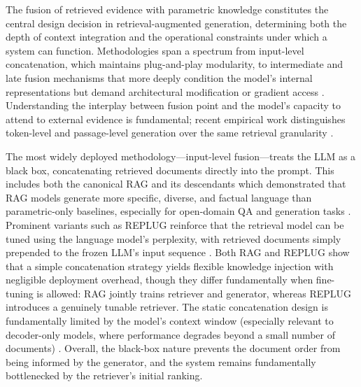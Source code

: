 \documentclass[11pt,a4paper]{article}
\begin{document}
The fusion of retrieved evidence with parametric knowledge constitutes the central design decision in retrieval-augmented generation, determining both the depth of context integration and the operational constraints under which a system can function. Methodologies span a spectrum from input-level concatenation, which maintains plug-and-play modularity, to intermediate and late fusion mechanisms that more deeply condition the model's internal representations but demand architectural modification or gradient access \cite{arxiv:2312.10997v5,arxiv:2508.06401v3}. Understanding the interplay between fusion point and the model's capacity to attend to external evidence is fundamental; recent empirical work distinguishes token-level and passage-level generation over the same retrieval granularity \cite{arxiv:2005.11401v4}.

The most widely deployed methodology---input-level fusion---treats the LLM as a black box, concatenating retrieved documents directly into the prompt. This includes both the canonical RAG and its descendants \cite{arxiv:2312.10997v5} which demonstrated that RAG models generate more specific, diverse, and factual language than parametric-only baselines, especially for open-domain QA and generation tasks \cite{arxiv:2005.11401v4}. Prominent variants such as REPLUG reinforce that the retrieval model can be tuned using the language model's perplexity, with retrieved documents simply prepended to the frozen LLM's input sequence \cite{arxiv:2301.12652v4}. Both RAG and REPLUG show that a simple concatenation strategy yields flexible knowledge injection with negligible deployment overhead, though they differ fundamentally when fine-tuning is allowed: RAG jointly trains retriever and generator, whereas REPLUG introduces a genuinely tunable retriever. The static concatenation design is fundamentally limited by the model's context window (especially relevant to decoder-only models, where performance degrades beyond a small number of documents) \cite{arxiv:2403.09040v1}. Overall, the black-box nature prevents the document order from being informed by the generator, and the system remains fundamentally bottlenecked by the retriever's initial ranking.
\end{document}
